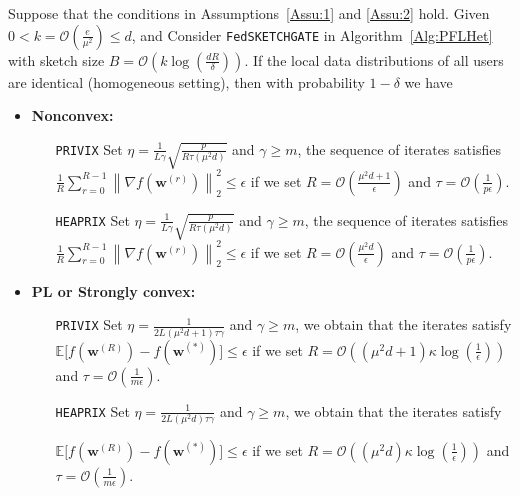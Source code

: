 \documentclass[review,onefignum,onetabnum]{siamart190516}
\begin{document}
\begin{theorem}\label{thm:hetereg_case}
  Suppose that the conditions in Assumptions~\ref{Assu:1} and \ref{Assu:2} hold. Given $0<k=\mathcal{O}\left(\frac{e}{\mu^2}\right)\leq d$, and Consider \texttt{FedSKETCHGATE} in Algorithm~\ref{Alg:PFLHet} with sketch size $B=\mathcal{O}\left(k\log\left(\frac{d R}{\delta}\right)\right)$. If the local data distributions of all users are identical (homogeneous setting), then with probability $1-\delta$ we have  
 \begin{itemize}
     \item \textbf{Nonconvex:}  
     \begin{itemize}
         \item [\texttt{PRIVIX}] Set $\eta=\frac{1}{L\gamma}\sqrt{\frac{p}{R\tau\left(\mu^2d\right)}}$ and $\gamma\geq m$, the sequence of iterates satisfies  $\frac{1}{R}\sum_{r=0}^{R-1}\left\|\nabla f({\boldsymbol{w}}^{(r)})\right\|_2^2\leq {\epsilon}$ if we set
     $R=\mathcal{O}\left(\frac{\mu^2d+1}{\epsilon}\right)$ and $ \tau=\mathcal{O}\left(\frac{1}{{p}\epsilon}\right)$.

         \item [\texttt{HEAPRIX}] Set 
 $\eta=\frac{1}{L\gamma}\sqrt{\frac{p}{R\tau\left(\mu^2d\right)}}$ and $\gamma\geq m$, the sequence of iterates satisfies  $\frac{1}{R}\sum_{r=0}^{R-1}\left\|\nabla f({\boldsymbol{w}}^{(r)})\right\|_2^2\leq {\epsilon}$ if we set
     $R=\mathcal{O}\left(\frac{\mu^2d}{\epsilon}\right)$ and $ \tau=\mathcal{O}\left(\frac{1}{{p}\epsilon}\right)$. 
     \end{itemize}
     
     \item \textbf{PL or Strongly convex:}
      \begin{itemize}
         \item [\texttt{PRIVIX}] Set $\eta=\frac{1}{2L\left({\mu^2d}+1\right)\tau\gamma}$ and $\gamma\geq m$, we obtain that the iterates satisfy $\mathbb{E}\Big[f({\boldsymbol{w}}^{(R)})-f({\boldsymbol{w}}^{(*)})\Big]\leq \epsilon$ if  we set
     $R=\mathcal{O}\left(\left(\mu^2d+1\right)\kappa\log\left(\frac{1}{\epsilon}\right)\right)$ and $ \tau=\mathcal{O}\left(\frac{1}{m\epsilon}\right)$.
          
         \item [\texttt{HEAPRIX}] Set $\eta=\frac{1}{2L\left(\mu^2d\right)\tau\gamma}$ and $\gamma\geq m$, we obtain that the iterates satisfy
         
         $\mathbb{E}\Big[f({\boldsymbol{w}}^{(R)})-f({\boldsymbol{w}}^{(*)})\Big]\leq \epsilon$ if  we set
     $R=\mathcal{O}\left(\left(\mu^2d\right)\kappa\log\left(\frac{1}{\epsilon}\right)\right)$ and $ \tau=\mathcal{O}\left(\frac{1}{m\epsilon}\right)$. 
      \end{itemize}
      

\end{itemize}
\end{theorem}
\end{document}
